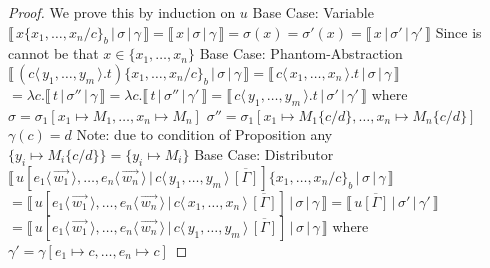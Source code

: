 \documentclass[a4paper,UKenglish,cleveref, autoref]{lipics-v2019}
\newcommand{\set}[1]{ \{ #1 \} }
\newcommand{\abs}[2]{\lambda #1 . #2}
\newcommand{\fake}[3]{#1 \langle \, #2 \, \rangle . #3}
\newcommand{\dist}[5]{#1 [ #2 \, \vert \, \fakedist{#4}{#5} \, #3 ]}
\newcommand{\fakedist}[2]{#1 \langle \, #2 \, \rangle}
\newcommand{\sub}[3]{#1 \{ #2 / #3 \}}
\newcommand{\psub}[3]{#1 \{ #2 / #3 \}_{b}}
\newcommand{\readbackwmap}[3]{\llbracket \, #1 \, \vert \, #2 \, \vert \, #3  \, \rrbracket }
\begin{document}
\begin{proof}
We prove this by induction on $u$
\newline
\newline
Base Case: Variable
\newline
$\readbackwmap{x \psub{}{x_{1}, \dots, x_{n}}{c}}{\sigma}{\gamma} = \readbackwmap{x}{\sigma}{\gamma} = \sigma(x) = \sigma'(x) = \readbackwmap{x}{\sigma'}{\gamma'}$
\newline
Since is cannot be that $x \in \set{x_{1}, \dots, x_{n}}$
\newline
\newline
Base Case: Phantom-Abstraction
\newline
$\readbackwmap{(\fake{c}{y_{1}, \dots, y_{m}}{t}) \psub{}{x_{1}, \dots, x_{n}}{c}}{\sigma}{\gamma} = \readbackwmap{\fake{c}{x_{1}, \dots, x_{n}}{t}}{\sigma}{\gamma}$
\newline
$= \abs{c}{\readbackwmap{t}{\sigma''}{\gamma}} = \abs{c}{\readbackwmap{t}{\sigma''}{\gamma'}}  = \readbackwmap{\fake{c}{y_{1}, \dots, y_{m}}{t}}{\sigma'}{\gamma'}$
\newline
where
\newline
$\sigma = \sigma_{1} [x_{1} \mapsto M_{1} , \dots ,  x_{n} \mapsto M_{n} ]$
\newline
$\sigma'' = \sigma_{1} [x_{1} \mapsto M_{1} \sub{}{c}{d} , \dots ,  x_{n} \mapsto M_{n} \sub{}{c}{d} ]$
\newline
$\gamma(c) = d$
\newline
Note: due to condition of Proposition any $\set{y_{i} \mapsto M_{i} \sub{}{c}{d}} = \set{ y_{i} \mapsto M_{i} }$
\newline
\newline
Base Case: Distributor
\newline
$\readbackwmap{\dist{u}{\fakedist{e_{1}}{\vec{w_{1}}}, \dots, \fakedist{e_{n}}{\vec{w_{n}}}}{\overline{[\Gamma]}}{c}{y_{1}, \dots, y_{m}}  \psub{}{x_{1}, \dots, x_{n}}{c}}{\sigma}{\gamma}$
\newline
$= \readbackwmap{\dist{u}{\fakedist{e_{1}}{\vec{w_{1}}}, \dots, \fakedist{e_{n}}{\vec{w_{n}}}}{\overline{[\Gamma]}}{c}{x_{1}, \dots, x_{n}} }{\sigma}{\gamma} = \readbackwmap{u \overline{[\Gamma]}}{\sigma'}{\gamma'}$
\newline
$= \readbackwmap{\dist{u}{\fakedist{e_{1}}{\vec{w_{1}}}, \dots, \fakedist{e_{n}}{\vec{w_{n}}}}{\overline{[\Gamma]}}{c}{y_{1}, \dots, y_{m}} }{\sigma}{\gamma}$
\newline
where
$\gamma' = \gamma [e_{1} \mapsto c, \dots, e_{n} \mapsto c]$
\newline

\end{proof}
\end{document}
